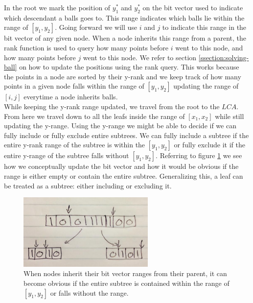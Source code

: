In the root we mark the position of $y^*_1$ and $y^*_2$ on the bit vector used to indicate which descendant a balls goes to. This range indicates which balls lie within the range of $[y_1, y_2]$. Going forward we will use $i$ and $j$ to indicate this range in the bit vector of any given node. When  a node inherits this range from a parent, the rank function is used to query how many points before $i$ went to this node, and how many points before $j$ went to this node. We refer to section \ref{ssection:solving-ball} on how to update the positions using the rank query. This works because the points in a node are sorted by their y-rank and we keep track of how many points in a given node falls within the range of $[y_1, y_2]$ updating the range of $[i,j]$ everytime a node inherits balls. \\

While keeping the y-rank range updated, we travel from the root to the $LCA$. From here we travel down to all the leafs inside the range of $[x_1, x_2]$ while still updating the y-range. Using the y-range we might be able to decide if we can fully include or fully exclude entire subtrees. We can fully include a subtree if the entire y-rank range of the subtree is within the $[y_1, y_2]$ or fully exclude it if the entire y-range of the subtree falls without $[y_1, y_2]$. Referring to figure \ref{fig:bitvectorsplit} we see how we conceptually update the bit vector and how it would be obvious if the range is either empty or contain the entire subtree. Generalizing this, a leaf can be treated as a subtree: either including or excluding it. \\

\begin{figure}[H]
    \centering
    \includegraphics[width=0.6\textwidth]{pictures/bit_vector_split.png}
    \caption{When nodes inherit their bit vector ranges from their parent, it can become obvious if the entire subtree is contained within the range of $[y_1, y_2]$ or falls without the range.}
    \label{fig:bitvectorsplit}
\end{figure}


